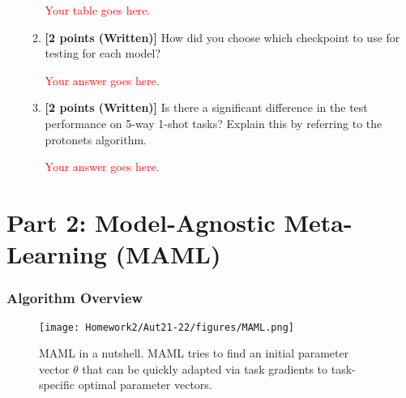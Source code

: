 \documentclass[12pt]{article}
\begin{document}
\begin{enumerate}
\begin{enumerate}
        \textcolor{red}{Your table goes here.}
        
        \item  \textbf{[2 points (Written)]} How did you choose which checkpoint to use for testing for each model? 
        
        \textcolor{red}{Your answer goes here.}
        
        \item  \textbf{[2 points (Written)]} Is there a significant difference in the test performance on 5-way 1-shot tasks? Explain this by referring to the protonets algorithm.
        
        \textcolor{red}{Your answer goes here.}

    \end{enumerate}
    
    

\end{enumerate}



\newpage
\section*{Part 2: Model-Agnostic Meta-Learning (MAML)~\cite{maml}}

\subsubsection*{Algorithm Overview}

\begin{figure}[H]
\centering
\texttt{[image: Homework2/Aut21-22/figures/MAML.png]}
\vspace{-3mm}
\caption{MAML in a nutshell. MAML tries to find an initial parameter vector $\theta$ that can be quickly adapted via task gradients to task-specific optimal parameter vectors.}
\label{fig:maml}
\end{figure}
\end{document}
